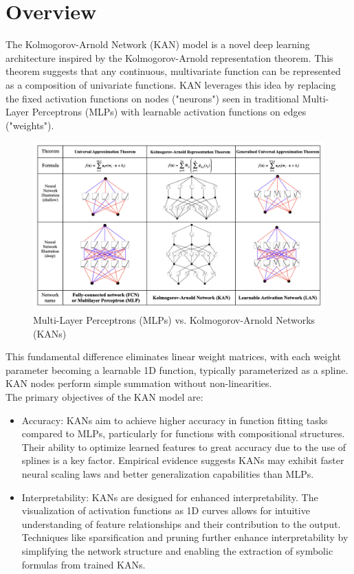 \setcounter{equation}{0}

\nomenclature{}{}

\chapter{Overview}

The Kolmogorov-Arnold Network (KAN) model is a novel deep learning architecture inspired by the Kolmogorov-Arnold representation theorem. This theorem suggests that any continuous, multivariate function can be represented as a composition of univariate functions. KAN leverages this idea by replacing the fixed activation functions on nodes ("neurons") seen in traditional Multi-Layer Perceptrons (MLPs) with learnable activation functions on edges ("weights"). 
\begin{figure}[t]
    \centering
    \includegraphics[width=1\linewidth]{Images/theory_model.png}
    \caption{Multi-Layer Perceptrons (MLPs) vs. Kolmogorov-Arnold Networks (KANs)}
\end{figure}

This fundamental difference eliminates linear weight matrices, with each weight parameter becoming a learnable 1D function, typically parameterized as a spline. KAN nodes perform simple summation without non-linearities.
\\
The primary objectives of the KAN model are:

\begin{itemize}
    \item Accuracy: KANs aim to achieve higher accuracy in function fitting tasks compared to MLPs, particularly for functions with compositional structures. Their ability to optimize learned features to great accuracy due to the use of splines is a key factor. Empirical evidence suggests KANs may exhibit faster neural scaling laws and better generalization capabilities than MLPs.
    \item Interpretability: KANs are designed for enhanced interpretability. The visualization of activation functions as 1D curves allows for intuitive understanding of feature relationships and their contribution to the output. Techniques like sparsification and pruning further enhance interpretability by simplifying the network structure and enabling the extraction of symbolic formulas from trained KANs.
\end{itemize}

